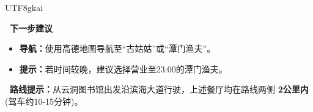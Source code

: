 \begin{CJK*}{UTF8}{gkai}
\begin{tcolorbox}[
    breakable,
    enhanced,
    colframe=color_amapblue,
    colback=mycolor,
    coltitle=white,
    title = {\textbf{Case Study: Route-based Dining Recommendation}},
    fonttitle=\bfseries
]
\begin{tcolorbox}[colback=white, colframe=color_amapblue!30!white, arc=4pt, boxrule=1pt, left=4pt, right=4pt, top=4pt, bottom=4pt]
    \textbf{\textcolor{color_amapblue}{\faMapMarker*\ 下一步建议}}
    \begin{itemize}[leftmargin=12pt, itemsep=0pt, topsep=2pt]
        \item \textbf{导航：}使用高德地图导航至“古姑姑”或“潭门渔夫”。
        \item \textbf{提示：}若时间较晚，建议选择营业至23:00的潭门渔夫。
    \end{itemize}
    
    \vspace{3pt}
    
    \colorbox{color_amapgrey}{\parbox{\dimexpr\linewidth-6pt}{
        \scriptsize 
        \textbf{\faCar\ 路线提示：}从云洞图书馆出发沿滨海大道行驶，上述餐厅均在路线两侧 \textbf{2公里内} (驾车约10-15分钟)。
    }}
\end{tcolorbox}

\end{tcolorbox}






\end{CJK*}
